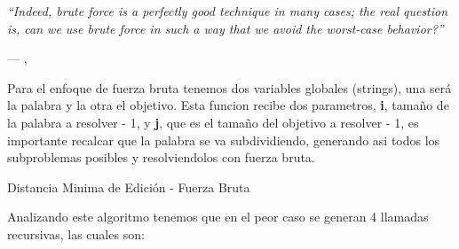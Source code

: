 \epigraph{\textit{``Indeed, brute force is a perfectly good technique in many cases; the real question is, can we use brute force in such a way that we avoid the worst-case behavior?''}}{--- \citeauthor{taocv3}, \citeyear{taocv3} \cite{taocv3}}

Para el enfoque de fuerza bruta tenemos dos variables globales (strings), una será la palabra y la otra el objetivo. Esta funcion recibe dos parametros, \textbf{i}, tamaño de la palabra a resolver - 1, y \textbf{j}, que es el tamaño del objetivo a resolver - 1, es importante recalcar que la palabra se va subdividiendo, generando asi todos los subproblemas posibles y resolviendolos con fuerza bruta.

\begin{algorithm}[H]
    
    \DontPrintSemicolon
    \footnotesize

    \;


    \caption{Distancia Minima de Edición - Fuerza Bruta}
    \label{alg:mi_algoritmo_1}
\end{algorithm}
\vspace{0.5em}
Analizando este algoritmo tenemos que en el peor caso se generan 4 llamadas recursivas, las cuales son:

